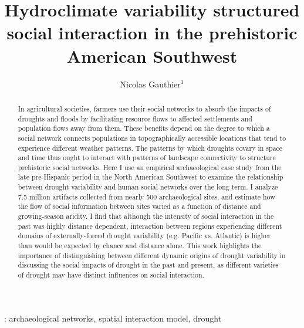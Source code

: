 \documentclass[10pt]{iopart}
\begin{document}
\title{Hydroclimate variability structured social interaction in the prehistoric American Southwest}

\author{Nicolas Gauthier$^1$}

\address{$^1$ School of Human Evolution and Social Change, 900 S Cady Mall, Tempe, USA}


\begin{abstract}
  In agricultural societies, farmers use their social networks to absorb the impacts of droughts and floods by facilitating resource flows to affected settlements and population flows away from them. These benefits depend on the degree to which a social network connects populations in topographically accessible locations that tend to experience different weather patterns. The patterns by which droughts covary in space and time thus ought to interact with patterns of landscape connectivity to structure prehistoric social networks. Here I use an empirical archaeological case study from the late pre-Hispanic period in the North American Southwest to examine the relationship between drought variability and human social networks over the long term. I analyze 7.5 million artifacts collected from nearly 500 archaeological sites, and estimate how the flow of social information between sites varied as a function of distance and growing-season aridity. I find that although the intensity of social interaction in the past was highly distance dependent, interaction between regions experiencing different domains of externally-forced drought variability (e.g. Pacific vs. Atlantic) is higher than would be expected by chance and distance alone. This work highlights the importance of distinguishing between different dynamic origins of drought variability in discussing the social impacts of drought in the past and present, as different varieties of drought may have distinct influences on social interaction.
\end{abstract}

: archaeological networks, spatial interaction model, drought

\maketitle

\ioptwocol
\end{document}
